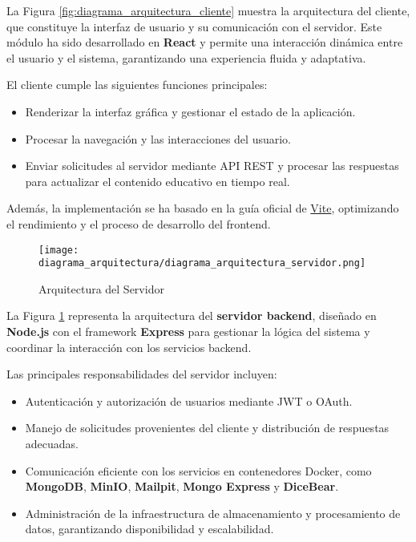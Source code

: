 La Figura \ref{fig:diagrama_arquitectura_cliente} muestra la arquitectura del
cliente, que constituye la interfaz de usuario y su comunicación con el
servidor. Este módulo ha sido desarrollado en \textbf{React} y permite una
interacción dinámica entre el usuario y el sistema, garantizando una experiencia
fluida y adaptativa.

El cliente cumple las siguientes funciones principales:
\begin{itemize}
    \item Renderizar la interfaz gráfica y gestionar el estado de la aplicación.
    \item Procesar la navegación y las interacciones del usuario.
    \item Enviar solicitudes al servidor mediante API REST y procesar las
    respuestas para actualizar el contenido educativo en tiempo real.
\end{itemize}

Además, la implementación se ha basado en la guía oficial de
\href{https://vite.dev/guide/}{Vite}, optimizando el rendimiento y el proceso de
desarrollo del frontend.

\begin{figure}[htbp]
    \centering
    \texttt{[image: diagrama\_arquitectura/diagrama\_arquitectura\_servidor.png]}
    \caption{Arquitectura del Servidor}
    \label{fig:diagrama_arquitectura_servidor}
\end{figure}

La Figura \ref{fig:diagrama_arquitectura_servidor} representa la arquitectura
del \textbf{servidor backend}, diseñado en \textbf{Node.js} con el framework
\textbf{Express} para gestionar la lógica del sistema y coordinar la interacción
con los servicios backend.

Las principales responsabilidades del servidor incluyen:
\begin{itemize}
    \item Autenticación y autorización de usuarios mediante JWT o OAuth.
    \item Manejo de solicitudes provenientes del cliente y distribución de
    respuestas adecuadas.
    \item Comunicación eficiente con los servicios en contenedores Docker, como
    \textbf{MongoDB}, \textbf{MinIO}, \textbf{Mailpit}, \textbf{Mongo Express} y
    \textbf{DiceBear}.
    \item Administración de la infraestructura de almacenamiento y procesamiento
    de datos, garantizando disponibilidad y escalabilidad.
\end{itemize}

